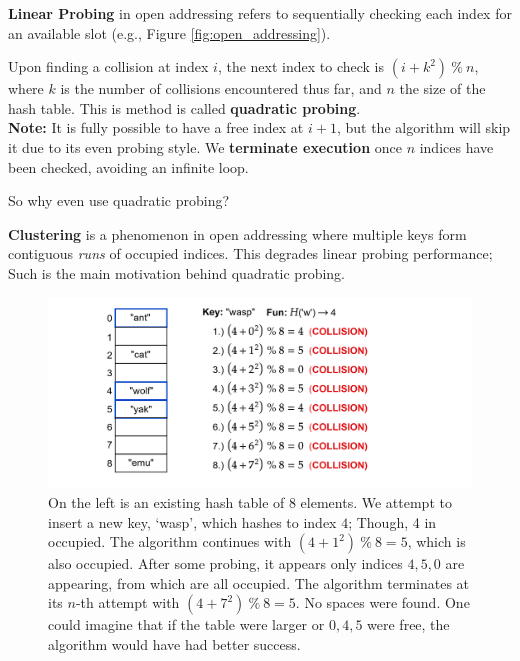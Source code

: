 \begin{Def}

   \textbf{Linear Probing} in open addressing refers to sequentially checking each index for an available slot (e.g., Figure \ref{fig:open_addressing}).
\end{Def}

\newpage

\begin{Def}

    Upon finding a collision at index $i$, the next index to check is $(i + k^2)\ \%\ n$, 
    where $k$ is the number of collisions encountered thus far, and $n$ the size of the hash table.
    This is method is called \textbf{quadratic probing}.\\

    \noindent
    \textbf{Note:} It is fully possible to have a free index at $i + 1$, but the algorithm will skip it due to its even probing style.
    We \textbf{terminate execution} once $n$ indices have been checked, avoiding an infinite loop.
\end{Def}

\noindent
So why even use quadratic probing?
\begin{Def}[Clustering]

    \textbf{Clustering} is a phenomenon in open addressing where multiple keys form contiguous \emph{runs} of occupied indices.
    This degrades linear probing performance; Such is the main motivation behind quadratic probing.
\end{Def}

\begin{figure}[ht!]

    \centering
    \includegraphics[width=\textwidth]{Sections/hash/quadratic_probing.png}
    \caption{On the left is an existing hash table of 8 elements. We attempt to insert a new key, `wasp', which hashes to index $4$;
    Though, 4 in occupied. The algorithm continues with $(4 + 1^2)\ \%\ 8 = 5$, which is also occupied. After some probing, it appears only indices $4, 5, 0$
    are appearing, from which are all occupied. The algorithm terminates at its $n$-th attempt with $(4+7^2)\ \%\ 8 = 5$. No spaces were found. One could imagine
    that if the table were larger or $0,4,5$ were free, the algorithm would have had better success.}
    \label{fig:quadratic_probing}
\end{figure}

